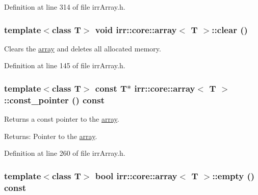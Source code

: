 Definition at line 314 of file irrArray.h.\hypertarget{classirr_1_1core_1_1array_611c70809111b608a103f86e004d6eb7}{
\subsubsection[{clear}]{\setlength{\rightskip}{0pt plus 5cm}template$<$class T$>$ void {\bf irr::core::array}$<$ T $>$::clear ()}}
\label{classirr_1_1core_1_1array_611c70809111b608a103f86e004d6eb7}


Clears the \hyperlink{classirr_1_1core_1_1array}{array} and deletes all allocated memory. 



Definition at line 145 of file irrArray.h.\hypertarget{classirr_1_1core_1_1array_bf62c8ec9581f618a4412721568b349e}{
\subsubsection[{const\_\-pointer}]{\setlength{\rightskip}{0pt plus 5cm}template$<$class T$>$ const T$\ast$ {\bf irr::core::array}$<$ T $>$::const\_\-pointer () const}}
\label{classirr_1_1core_1_1array_bf62c8ec9581f618a4412721568b349e}


Returns a const pointer to the \hyperlink{classirr_1_1core_1_1array}{array}. \begin{Desc}
\item[Returns:]Pointer to the \hyperlink{classirr_1_1core_1_1array}{array}. \end{Desc}


Definition at line 260 of file irrArray.h.\hypertarget{classirr_1_1core_1_1array_80b1c057a23ab3d3ca84db8737659943}{
\subsubsection[{empty}]{\setlength{\rightskip}{0pt plus 5cm}template$<$class T$>$ bool {\bf irr::core::array}$<$ T $>$::empty () const}}
\label{classirr_1_1core_1_1array_80b1c057a23ab3d3ca84db8737659943}


